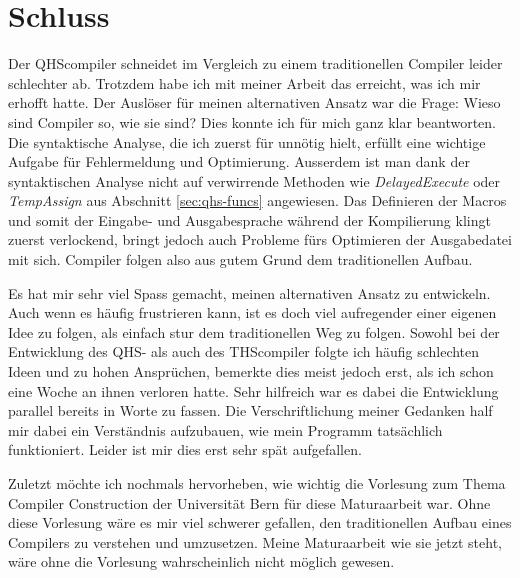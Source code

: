 \chapter{Schluss}
Der QHScompiler schneidet im Vergleich zu einem traditionellen Compiler leider schlechter ab.
Trotzdem habe ich mit meiner Arbeit das erreicht, was ich mir erhofft hatte. Der Auslöser für meinen alternativen Ansatz war die Frage: Wieso sind Compiler so, wie sie sind? 
Dies konnte ich für mich ganz klar beantworten. Die syntaktische Analyse, die ich zuerst für unnötig hielt, erfüllt eine wichtige Aufgabe für Fehlermeldung und Optimierung.
Ausserdem ist man dank der syntaktischen Analyse nicht auf verwirrende Methoden wie \textit{DelayedExecute} oder \textit{TempAssign} aus Abschnitt \ref{sec:qhs-funcs} angewiesen.
Das Definieren der Macros und somit der Eingabe- und Ausgabesprache während der Kompilierung klingt zuerst verlockend, bringt jedoch auch Probleme fürs Optimieren der Ausgabedatei mit sich.
Compiler folgen also aus gutem Grund dem traditionellen Aufbau.

Es hat mir sehr viel Spass gemacht, meinen alternativen Ansatz zu entwickeln. Auch wenn es häufig frustrieren kann, ist es doch viel aufregender einer eigenen Idee zu folgen, als einfach stur dem traditionellen Weg zu folgen.
Sowohl bei der Entwicklung des QHS- als auch des THScompiler folgte ich häufig schlechten Ideen und zu hohen Ansprüchen, bemerkte dies meist jedoch erst, als ich schon eine Woche an ihnen verloren hatte.
Sehr hilfreich war es dabei die Entwicklung parallel bereits in Worte zu fassen. Die Verschriftlichung meiner Gedanken half mir dabei ein Verständnis aufzubauen, wie mein Programm tatsächlich funktioniert.
Leider ist mir dies erst sehr spät aufgefallen.

Zuletzt möchte ich nochmals hervorheben, wie wichtig die Vorlesung zum Thema Compiler Construction der Universität Bern \cite{Lecture} für diese Maturaarbeit war.
Ohne diese Vorlesung wäre es mir viel schwerer gefallen, den traditionellen Aufbau eines Compilers zu verstehen und umzusetzen.
Meine Maturaarbeit wie sie jetzt steht, wäre ohne die Vorlesung wahrscheinlich nicht möglich gewesen.

